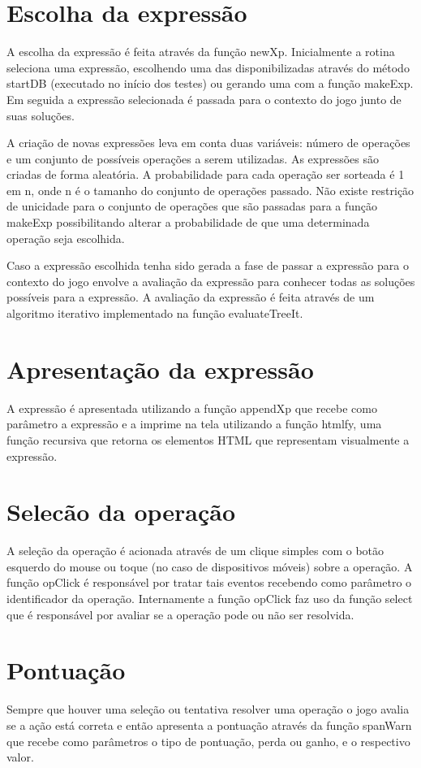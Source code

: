 \section{Escolha da expressão}
A escolha da expressão é feita através da função newXp. Inicialmente a rotina seleciona uma expressão, escolhendo uma das disponibilizadas através do método startDB (executado no início dos testes) ou gerando uma com a função makeExp. Em seguida a expressão selecionada é passada para o contexto do jogo junto de suas soluções.

A criação de novas expressões leva em conta duas variáveis: número de operações e um conjunto de possíveis operações a serem utilizadas. As expressões são criadas de forma aleatória. A probabilidade para cada operação ser sorteada é 1 em n, onde n é o tamanho do conjunto de operações passado. 	Não existe restrição de unicidade para o conjunto de operações que são passadas para a função makeExp possibilitando alterar a probabilidade de que uma determinada operação seja escolhida.

Caso a expressão escolhida tenha sido gerada a fase de passar a expressão para o contexto do jogo envolve a avaliação da expressão para conhecer todas as soluções possíveis para a expressão. A avaliação da expressão é feita através de um algoritmo iterativo implementado na função evaluateTreeIt.

\section{Apresentação da expressão}
A expressão é apresentada utilizando a função appendXp que recebe como parâmetro a expressão e a imprime na tela utilizando a função htmlfy, uma função recursiva que retorna os elementos HTML que representam visualmente a expressão.

\section{Selecão da operação}
A seleção da operação é acionada através de um clique simples com o botão esquerdo do mouse ou toque (no caso de dispositivos móveis) sobre a operação. A função opClick é responsável por tratar tais eventos recebendo como parâmetro o identificador da operação. Internamente a função opClick faz uso da função select que é responsável por avaliar se a operação pode ou não ser resolvida.

\section{Pontuação}
Sempre que houver uma seleção ou tentativa resolver uma operação o jogo avalia se a ação está correta e então apresenta a pontuação através da função spanWarn que recebe como parâmetros o tipo de pontuação, perda ou ganho, e o respectivo valor.

